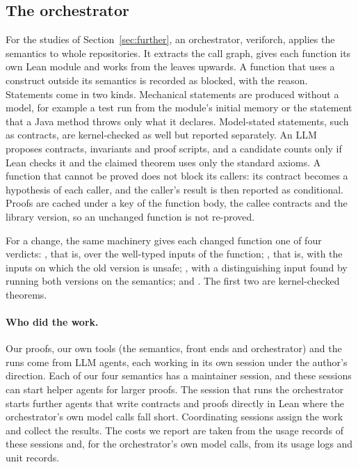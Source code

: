 \subsection{The orchestrator}

For the studies of Section~\ref{sec:further}, an orchestrator, veriforch, applies the semantics to whole repositories.
It extracts the call graph, gives each function its own Lean module and works from the leaves upwards. A function
that uses a construct outside its semantics is recorded as blocked, with the reason. Statements come in two kinds.
Mechanical statements are produced without a model, for example a test run from the module's initial memory or the
statement that a Java method throws only what it declares. Model-stated statements, such as contracts, are
kernel-checked as well but reported separately. An LLM proposes contracts, invariants and proof scripts, and a
candidate counts only if Lean checks it and the claimed theorem uses only the standard axioms. A function that cannot
be proved does not block its callers: its contract becomes a hypothesis of each caller, and the caller's result is then
reported as conditional. Proofs are cached under a key of the function body, the callee contracts and the library
version, so an unchanged function is not re-proved.

For a change, the same machinery gives each changed function one of four verdicts: , that is,
 over the well-typed inputs of the function;
, that is,  with  the inputs on which the old version is
unsafe; , with a distinguishing input found by running both versions on the semantics; and
. The first two are kernel-checked theorems.

\paragraph{Who did the work.} Our proofs, our own tools (the semantics, front ends and orchestrator) and the runs come
from LLM agents, each working in its own session under the author's direction. Each of our four semantics has a
maintainer session, and these sessions can start helper agents for larger proofs. The session that runs the
orchestrator starts further agents that write contracts and proofs directly in Lean where the orchestrator's own model
calls fall short. Coordinating sessions assign the work and collect the results. The costs we report are taken from the usage records of these sessions and, for the orchestrator's own model calls, from its
usage logs and unit records.
